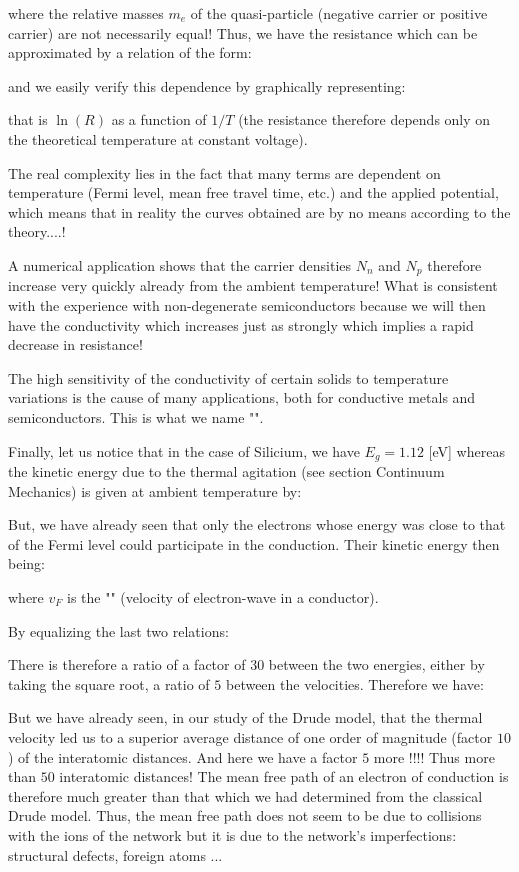 	where the relative masses $m_e$ of the quasi-particle (negative carrier or positive carrier) are not necessarily equal! Thus, we have the resistance which can be approximated by a relation of the form:
	
	and we easily verify this dependence by graphically representing:
	
	that is $\ln(R)$ as a function of $1/T$ (the resistance therefore depends only on the theoretical temperature at constant voltage).
	
	The real complexity lies in the fact that many terms are dependent on temperature (Fermi level, mean free travel time, etc.) and the applied potential, which means that in reality the curves obtained are by no means according to the theory....!
	
	A numerical application shows that the carrier densities $N_n$ and $N_p$ therefore increase very quickly already from the ambient temperature! What is consistent with the experience with non-degenerate semiconductors because we will then have the conductivity which increases just as strongly which implies a rapid decrease in resistance!
	
	The high sensitivity of the conductivity of certain solids to temperature variations is the cause of many applications, both for conductive metals and semiconductors. This is what we name "".
	
	Finally, let us notice that in the case of Silicium, we have $E_g=1.12$ [eV] whereas the kinetic energy due to the thermal agitation ({see section Continuum Mechanics}) is given at ambient temperature by:
	
	But, we have already seen that only the electrons whose energy was close to that of the Fermi level could participate in the conduction. Their kinetic energy then being:
	
	where $v_F$ is the "" (velocity of electron-wave in a conductor).
	
	By equalizing the last two relations:
	
	There is therefore a ratio of a factor of $30$ between the two energies, either by taking the square root, a ratio of $5$ between the velocities. Therefore we have:
	
	 But we have already seen, in our study of the Drude model, that the thermal velocity led us to a superior average distance of one order of magnitude (factor $10$) of the interatomic distances. And here we have a factor $5$ more !!!! Thus more than $50$ interatomic distances! The mean free path of an electron of conduction is therefore much greater than that which we had determined from the classical Drude model. Thus, the mean free path does not seem to be due to collisions with the ions of the network but it is due to the network's imperfections: structural defects, foreign atoms ...

